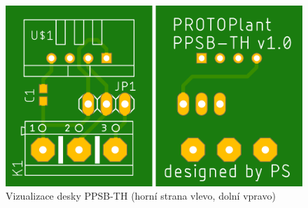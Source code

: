 \begin{figure}[h]
    \centering
    \includegraphics[width=\textwidth]{img/HARDWARE/PPSB-TH_BOTH.png}
    \caption{Vizualizace desky PPSB-TH (horní strana vlevo, dolní vpravo)}
    \label{fig:PPSB-TH_VISUAL}
\end{figure}

\newpage